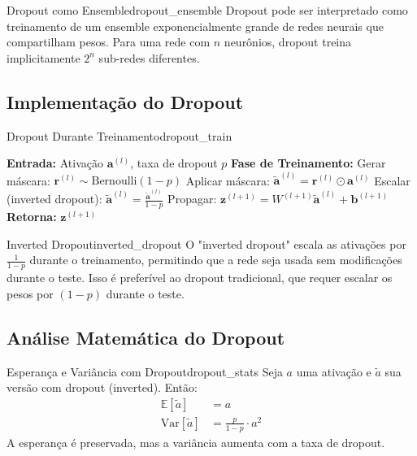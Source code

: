 \documentclass[a4paper,12pt]{article}
\begin{document}
\begin{teorema}{Dropout como Ensemble}{dropout_ensemble}
Dropout pode ser interpretado como treinamento de um ensemble exponencialmente grande de redes neurais que compartilham pesos. Para uma rede com $n$ neurônios, dropout treina implicitamente $2^n$ sub-redes diferentes.
\end{teorema}

\subsection{Implementação do Dropout}

\begin{algoritmo}{Dropout Durante Treinamento}{dropout_train}
\begin{algorithm}[H]
\caption{Forward Pass com Dropout}
\begin{algorithmic}[1]
\STATE \textbf{Entrada:} Ativação $\mathbf{a}^{(l)}$, taxa de dropout $p$
\STATE \textbf{Fase de Treinamento:}
\STATE Gerar máscara: $\mathbf{r}^{(l)} \sim \text{Bernoulli}(1-p)$
\STATE Aplicar máscara: $\tilde{\mathbf{a}}^{(l)} = \mathbf{r}^{(l)} \odot \mathbf{a}^{(l)}$
\STATE Escalar (inverted dropout): $\tilde{\mathbf{a}}^{(l)} = \frac{\tilde{\mathbf{a}}^{(l)}}{1-p}$
\STATE Propagar: $\mathbf{z}^{(l+1)} = W^{(l+1)}\tilde{\mathbf{a}}^{(l)} + \mathbf{b}^{(l+1)}$
\STATE \textbf{Retorna:} $\mathbf{z}^{(l+1)}$
\end{algorithmic}
\end{algorithm}
\end{algoritmo}

\begin{observacao}{Inverted Dropout}{inverted_dropout}
O "inverted dropout" escala as ativações por $\frac{1}{1-p}$ durante o treinamento, permitindo que a rede seja usada sem modificações durante o teste. Isso é preferível ao dropout tradicional, que requer escalar os pesos por $(1-p)$ durante o teste.
\end{observacao}

\subsection{Análise Matemática do Dropout}

\begin{teorema}{Esperança e Variância com Dropout}{dropout_stats}
Seja $a$ uma ativação e $\tilde{a}$ sua versão com dropout (inverted). Então:
\begin{align}
\mathbb{E}[\tilde{a}] &= a \\
\text{Var}[\tilde{a}] &= \frac{p}{1-p} \cdot a^2
\end{align}
A esperança é preservada, mas a variância aumenta com a taxa de dropout.
\end{teorema}
\end{document}
